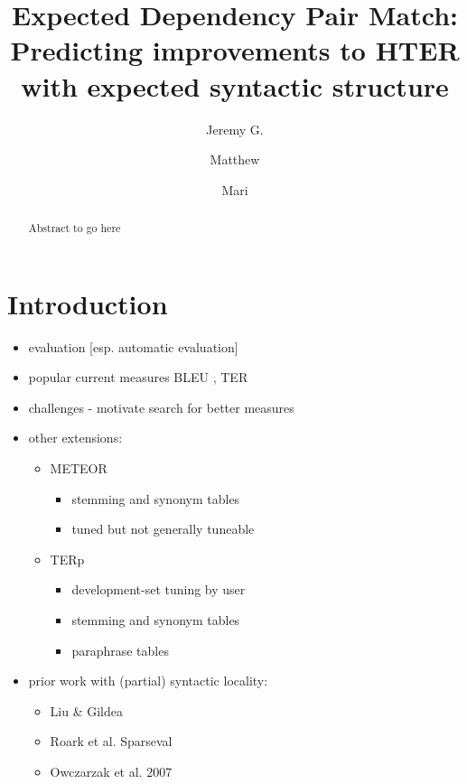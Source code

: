 \documentclass{kluwer}    %
\begin{document}
                                                                                   
\begin{article}
\begin{opening}         
\title{Expected Dependency Pair Match:\\
Predicting improvements to {HTER} with expected syntactic structure} 
\author{Jeremy G. }  
\author{Matthew }
\author{Mari }  

\begin{abstract}
Abstract to go here
\end{abstract}

\end{opening}           

\section{Introduction}

\begin{itemize}
\item evaluation [esp. automatic evaluation]
\item popular current
  measures BLEU \cite{papineni02bleu}, TER

\item challenges - motivate search for better measures

\item other extensions:
  \begin{itemize}
  \item METEOR 
    \begin{itemize}
    \item stemming and synonym tables
    \item tuned but not generally     tuneable
    \end{itemize}
  \item TERp
    \begin{itemize}
    \item development-set tuning by user
    \item stemming and synonym tables
    \item paraphrase tables
    \end{itemize}
  \end{itemize}
\item prior work with (partial) syntactic locality:
  \begin{itemize}
  \item Liu \& Gildea 
  \item Roark et al. Sparseval
  \item Owczarzak et al. 2007
  \end{itemize}



\end{itemize}
\end{article}
\end{document}
